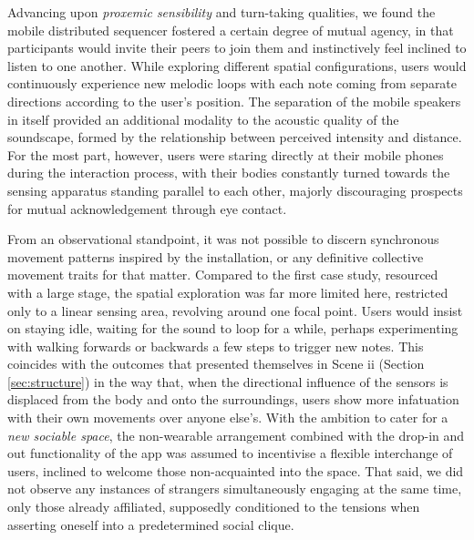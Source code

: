 Advancing upon \textit{proxemic sensibility} and turn-taking qualities, we found the mobile distributed sequencer fostered a certain degree of mutual agency, in that participants would invite their peers to join them and instinctively feel inclined to listen to one another. While exploring different spatial configurations, users would continuously experience new melodic loops with each note coming from separate directions according to the user's position. The separation of the mobile speakers in itself provided an additional modality to the acoustic quality of the soundscape, formed by the relationship between perceived intensity and distance. For the most part, however, users were staring directly at their mobile phones during the interaction process, with their bodies constantly turned towards the sensing apparatus standing parallel to each other, majorly discouraging prospects for mutual acknowledgement through eye contact.

From an observational standpoint, it was not possible to discern synchronous movement patterns inspired by the installation, or any definitive collective movement traits for that matter. Compared to the first case study, resourced with a large stage, the spatial exploration was far more limited here, restricted only to a linear sensing area, revolving around one focal point. Users would insist on staying idle, waiting for the sound to loop for a while, perhaps experimenting with walking forwards or backwards a few steps to trigger new notes. This coincides with the outcomes that presented themselves in Scene ii (Section \ref{sec:structure}) in the way that, when the directional influence of the sensors is displaced from the body and onto the surroundings, users show more infatuation with their own movements over anyone else's. With the ambition to cater for a \textit{new sociable space}, the non-wearable arrangement combined with the drop-in and out functionality of the app was assumed to incentivise a flexible interchange of users, inclined to welcome those non-acquainted into the space. That said, we did not observe any instances of strangers simultaneously engaging at the same time, only those already affiliated, supposedly conditioned to the tensions when asserting oneself into a predetermined social clique.

